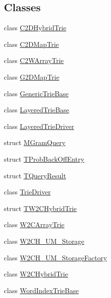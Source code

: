 \subsection*{Classes}
\begin{DoxyCompactItemize}
\item 
class \hyperlink{classuva_1_1smt_1_1tries_1_1_c2_d_hybrid_trie}{C2\+D\+Hybrid\+Trie}
\item 
class \hyperlink{classuva_1_1smt_1_1tries_1_1_c2_d_map_trie}{C2\+D\+Map\+Trie}
\item 
class \hyperlink{classuva_1_1smt_1_1tries_1_1_c2_w_array_trie}{C2\+W\+Array\+Trie}
\item 
class \hyperlink{classuva_1_1smt_1_1tries_1_1_g2_d_map_trie}{G2\+D\+Map\+Trie}
\item 
class \hyperlink{classuva_1_1smt_1_1tries_1_1_generic_trie_base}{Generic\+Trie\+Base}
\item 
class \hyperlink{classuva_1_1smt_1_1tries_1_1_layered_trie_base}{Layered\+Trie\+Base}
\item 
class \hyperlink{classuva_1_1smt_1_1tries_1_1_layered_trie_driver}{Layered\+Trie\+Driver}
\item 
struct \hyperlink{structuva_1_1smt_1_1tries_1_1_m_gram_query}{M\+Gram\+Query}
\item 
struct \hyperlink{structuva_1_1smt_1_1tries_1_1_t_prob_back_off_entry}{T\+Prob\+Back\+Off\+Entry}
\item 
struct \hyperlink{structuva_1_1smt_1_1tries_1_1_t_query_result}{T\+Query\+Result}
\item 
class \hyperlink{classuva_1_1smt_1_1tries_1_1_trie_driver}{Trie\+Driver}
\item 
struct \hyperlink{structuva_1_1smt_1_1tries_1_1_t_w2_c_hybrid_trie}{T\+W2\+C\+Hybrid\+Trie}
\item 
class \hyperlink{classuva_1_1smt_1_1tries_1_1_w2_c_array_trie}{W2\+C\+Array\+Trie}
\item 
class \hyperlink{classuva_1_1smt_1_1tries_1_1_w2_c_h___u_m___storage}{W2\+C\+H\+\_\+\+U\+M\+\_\+\+Storage}
\item 
class \hyperlink{classuva_1_1smt_1_1tries_1_1_w2_c_h___u_m___storage_factory}{W2\+C\+H\+\_\+\+U\+M\+\_\+\+Storage\+Factory}
\item 
class \hyperlink{classuva_1_1smt_1_1tries_1_1_w2_c_hybrid_trie}{W2\+C\+Hybrid\+Trie}
\item 
class \hyperlink{classuva_1_1smt_1_1tries_1_1_word_index_trie_base}{Word\+Index\+Trie\+Base}
\end{DoxyCompactItemize}
